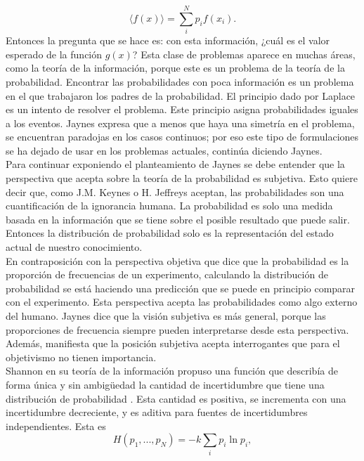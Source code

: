 \begin{equation}
\langle f(x) \rangle =\sum_{i}^{N} p_{i} f(x_{i}).
\end{equation}
Entonces la pregunta que se hace es: con esta información, ¿cuál es el valor esperado de la función $g(x)$? Esta clase de problemas aparece en muchas áreas, como la teoría de la información, porque este es un problema de la teoría de la probabilidad. Encontrar las probabilidades con poca información es un problema en el que trabajaron los padres de la probabilidad. El principio dado por Laplace es un intento de resolver el problema. Este principio asigna probabilidades iguales a los eventos. Jaynes expresa que a menos que haya una simetría en el problema, se encuentran paradojas en los casos continuos; por eso este tipo de formulaciones se ha dejado de usar en los problemas actuales, continúa diciendo Jaynes.
\\
Para continuar exponiendo el planteamiento de Jaynes se debe entender que la perspectiva que acepta sobre la teoría de la probabilidad es subjetiva. Esto quiere decir que, como J.M. Keynes o H. Jeffreys aceptan, las probabilidades son una cuantificación de la ignorancia humana. La probabilidad es solo una medida basada en la información que se tiene sobre el posible resultado que puede salir. Entonces la distribución de probabilidad solo es la representación del estado actual de nuestro conocimiento. \\
En contraposición con la perspectiva objetiva que dice que la probabilidad es la proporción de frecuencias de un experimento, calculando la distribución de probabilidad se está haciendo una predicción que se puede en principio comparar con el experimento. Esta perspectiva acepta las probabilidades como algo externo del humano. Jaynes dice que la visión subjetiva es más general, porque las proporciones de frecuencia siempre pueden interpretarse desde esta perspectiva. Además, manifiesta que la posición subjetiva acepta interrogantes que para el objetivismo no tienen importancia.
\\
Shannon en su teoría de la información propuso una función que describía de forma única y sin ambigüedad la cantidad de incertidumbre que tiene una distribución de probabilidad \cite{ShannonInformation}. Esta cantidad es positiva, se incrementa con una incertidumbre decreciente, y es aditiva para fuentes de incertidumbres independientes. Esta es
\begin{equation}
H(p_{1},...,p_{N})=-k \sum_{i} p_{i} \ln p_{i},
\end{equation}
